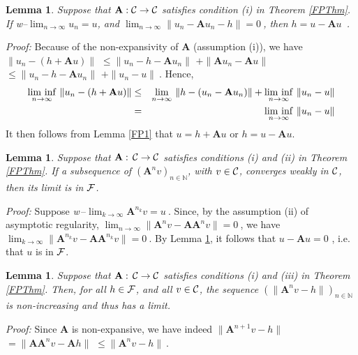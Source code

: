 \documentclass[10pt]{article}
\newtheorem{lemma}[theorem]{Lemma}
\newcommand{\QED}{\hfill \raisebox{-2pt}{\rule{5.6pt}{8pt}\rule{4pt}{0pt}}%
  \smallskip\par}
\def\N{\mathbb{N}}
\def\A{\mathbf{A}}
\begin{document}
\bigskip

\begin{lemma}
\label{FP2}
Suppose that $\A:\cal C \rightarrow \cal C$ satisfies condition
{\rm(i)} in Theorem \ref{FPThm}.\\
If  w--$\lim_{n \to \infty}u_n= u$, and
$\lim_{n \to \infty} \|u_n -\A u_n -h\| =0~$, then
$h = u -\A u$\ .
\end{lemma}
{\em Proof:}
Because of the non-expansivity of $\A $ (assumption (i)),
we have
$\| u_n - (h + \A u)\| $
$\leq \| u_n - h - \A  u_n\|$ $+\|  \A  u_n - \A  u\| $
$\leq \| u_n - h - \A  u_n\|$ $ +\|   u_n -  u \|~$.
Hence,
\begin{eqnarray*}
{\mathop{\rm lim\ inf}_{n \to \infty}}\ \| u_n - (h + \A  u)\|
&\leq&
{\mathop{\rm lim}_{n \to \infty}}\ \| h - (u_n - \A  u_n)\| +
{\mathop{\rm lim\ inf}_{n \to \infty}}\ \| u_n -  u\| \\
&=&
{\mathop{\rm lim\ inf}_{n \to \infty}}\ \| u_n -  u\|
\end{eqnarray*}
It then follows from Lemma \ref{FP1} that $u = h + \A  u$ or $h = u -
\A  u$.
\hfill\QED

\bigskip

\begin{lemma}
\label{FP3}
Suppose that $\A :\,\cal C \rightarrow \cal C$ satisfies conditions
{\rm(i)} and {\rm(ii)} in Theorem \ref{FPThm}.
If a subsequence of $(\A ^n v)_{n\in \mathbb{N}}$, with $v \in {\cal C}$,
converges weakly in ${\cal C}$, then its limit is in $\cal F$.
\end{lemma}
{\em Proof:}
Suppose {\em w}$\,$--$\lim_{k \to \infty}\A ^{n_k}v= u~$.
Since, by the assumption (ii) of asymptotic
regularity,
$\lim_{n \to \infty}\|\A ^{n} v - \A  \A ^{n} v \|=0~$,
we have
$\lim_{k \to \infty}\|\A ^{n_k} v - \A  \A ^{n_k} v \|=0~$.
By Lemma \ref{FP2}, it
follows that $u - \A u = 0$ , i.e. that $u$ is in $\cal F$.
\hfill\QED

\bigskip

\begin{lemma}
\label{FP4}
Suppose that $\A :\,\cal C \rightarrow \cal C$ satisfies conditions
{\rm(i)} and {\rm(iii)} in Theorem \ref{FPThm}. Then,
for all $h \in {\cal F}$, and all $v \in {\cal C}$, the sequence
$(\|\A ^n v -
h\|)_{n\in \N}\ $ is non-increasing and thus has a limit.
\end{lemma}
{\em Proof:}
Since $\A $ is non-expansive, we have indeed
$\| \A ^{n+1} v - h \|$
$= \| \A \A ^n v -\A   h\| $
$\leq \| \A ^{n} v - h \|~.$
$~~~~~~~~~~~~~~~~~~~~~~~~$\hfill\QED
\end{document}
